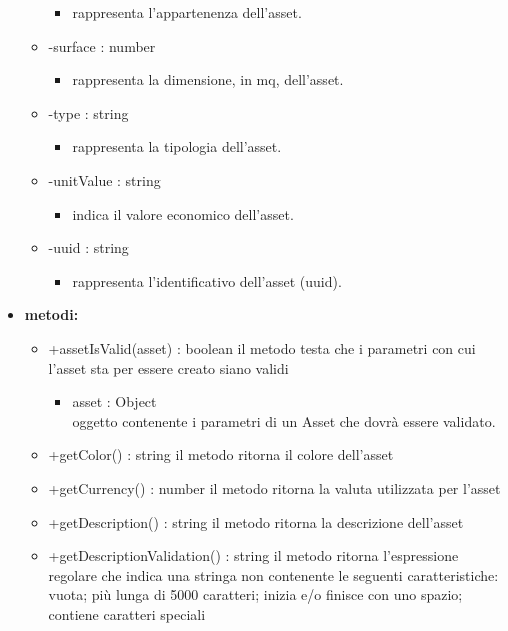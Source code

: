 \begin{itemize}
\begin{itemize}
\begin{itemize}
			\item rappresenta l'appartenenza dell'asset.\end{itemize}
		\item -surface : number\begin{itemize}
			\item rappresenta la dimensione, in mq, dell'asset.\end{itemize}
		\item -type : string\begin{itemize}
			\item rappresenta la tipologia dell'asset.\end{itemize}
		\item -unitValue : string\begin{itemize}
			\item indica il valore economico dell'asset.\end{itemize}
		\item -uuid : string\begin{itemize}
			\item rappresenta l'identificativo dell'asset (uuid).\end{itemize}
	\end{itemize}
	\item \textbf{metodi:}
	\begin{itemize}
		\item +assetIsValid(asset) : boolean\newline
		il metodo testa che i parametri con cui l'asset sta per essere creato siano validi
		\begin{itemize}
			\item asset : Object\\
			oggetto contenente i parametri di un Asset che dovrà essere validato.
		\end{itemize}
		\item +getColor() : string\newline
		il metodo ritorna il colore dell'asset
		\item +getCurrency() : number\newline
		il metodo ritorna la valuta utilizzata per l'asset
		\item +getDescription() : string\newline
		il metodo ritorna la descrizione dell'asset
		\item +getDescriptionValidation() : string\newline
		il metodo ritorna l'espressione regolare che indica una stringa non contenente le seguenti caratteristiche: vuota; più lunga di 5000 caratteri; inizia e/o finisce con uno spazio; contiene caratteri speciali

\end{itemize}
\end{itemize}
